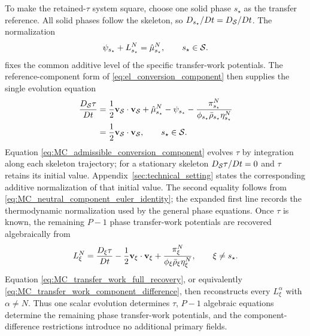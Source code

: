 To make the retained-\(\tau\) system square, choose one solid phase
\(s_\star\) as the transfer reference.  All solid phases follow the skeleton,
so \(D_{s_\star}/Dt=D_{\mathcal{S}}/Dt\).  The normalization
%
\begin{equation}
	\psi_{s_\star}+L_{s_\star}^N
	=
	\hat\mu_{s_\star}^N,
	\qquad
	s_\star\in\mathcal{S} .
	\label{eq:MC_transfer_work_reference_normalization}
\end{equation}
%
fixes the common additive level of the specific transfer-work potentials.  The
reference-component form
of \eqref{eq:el_conversion_component} then supplies the single evolution
equation
%
\begin{align}
	\frac{D_{\mathcal{S}}\tau}{Dt}
	={} &
	\frac{1}{2}
	\mathbf{v}_{\mathcal{S}}\cdot\mathbf{v}_{\mathcal{S}}
	+
	\hat\mu_{s_\star}^N
	-
	\psi_{s_\star}
	-
	\frac{\pi_{s_\star}^N}
	{\phi_{s_\star}\bar\rho_{s_\star}\eta_{s_\star}^N}
	\notag \\
	={} &
	\frac{1}{2}
	\mathbf{v}_{\mathcal{S}}\cdot\mathbf{v}_{\mathcal{S}},
	\qquad
	s_\star\in\mathcal{S} .
	\label{eq:MC_admissible_conversion_component}
\end{align}
%
Equation \eqref{eq:MC_admissible_conversion_component} evolves \(\tau\) by
integration along each skeleton trajectory; for a stationary skeleton
\(D_{\mathcal{S}}\tau/Dt=0\) and \(\tau\) retains its initial value.
Appendix~\ref{sec:technical_setting} states the corresponding additive
normalization of that initial value.  The second equality follows from
\eqref{eq:MC_neutral_component_euler_identity}; the expanded first line records
the thermodynamic normalization used by the general phase equations.
Once \(\tau\) is known, the remaining \(P-1\) phase transfer-work potentials are
recovered algebraically from
%
\begin{equation}
	L_\xi^N
	=
	\frac{D_\xi\tau}{Dt}
	-
	\frac{1}{2}
	\mathbf{v}_\xi\cdot\mathbf{v}_\xi
	+
	\frac{\pi_\xi^N}
	{\phi_\xi\bar\rho_\xi\eta_\xi^N},
	\qquad
	\xi\ne s_\star .
	\label{eq:MC_phase_reference_transfer_work_recovery}
\end{equation}
%
Equation \eqref{eq:MC_transfer_work_full_recovery}, or equivalently
\eqref{eq:MC_transfer_work_component_difference}, then reconstructs every
\(L_\xi^\alpha\) with \(\alpha\ne N\).  Thus one scalar evolution
determines \(\tau\), \(P-1\) algebraic equations determine the remaining phase
transfer-work potentials, and the component-difference restrictions introduce
no additional primary fields.

